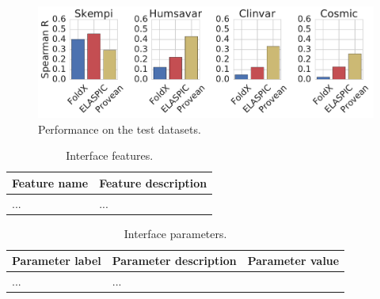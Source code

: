 \begin{figure}[h]
	\centering
	\includegraphics[width=1.0\textwidth]{static/elaspic_training_set/interface_machine_learning/final_performance.pdf}
	\caption{Performance on the test datasets.}
\end{figure}

\clearpage


\begin{table}[h]
\caption{Interface features.} \label{tab:interface_features}
\begin{tabular}{l | p{13cm}}
	\toprule
	Feature name & Feature description \\
	\midrule
	... & ... \\
	\bottomrule
\end{tabular}
\end{table}


\begin{table}[h]
\caption{Interface parameters.} \label{tab:interface_parameters}
\begin{tabular}{l | l | l}
	\toprule
	Parameter label & Parameter description & Parameter value \\
	\midrule
	... & ... \\
	\bottomrule
\end{tabular}
\end{table}
